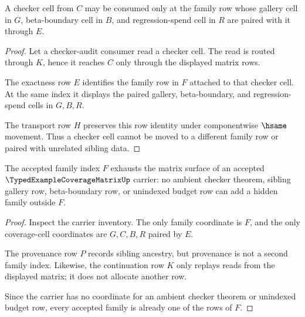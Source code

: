 \begin{theorem}
\label{thm:typed-example-coverage-matrix-checker-cell-locality}
A checker cell from $C$ may be consumed only at the family row whose gallery cell in $G$, beta-boundary cell in $B$, and regression-spend cell in $R$ are paired with it through $E$.
\end{theorem}
\begin{proof}
Let a checker-audit consumer read a checker cell. The read is routed through $K$, hence it reaches $C$ only through the displayed matrix rows.

The exactness row $E$ identifies the family row in $F$ attached to that checker cell. At the same index it displays the paired gallery, beta-boundary, and regression-spend cells in $G,B,R$.

The transport row $H$ preserves this row identity under componentwise $\hsame$ movement. Thus a checker cell cannot be moved to a different family row or paired with unrelated sibling data.
\end{proof}

\begin{theorem}
\label{thm:typed-example-coverage-matrix-family-exhaustion}
The accepted family index $F$ exhausts the matrix surface of an accepted $\TypedExampleCoverageMatrixUp$ carrier: no ambient checker theorem, sibling gallery row, beta-boundary row, or unindexed budget row can add a hidden family outside $F$.
\end{theorem}
\begin{proof}
Inspect the carrier inventory. The only family coordinate is $F$, and the only coverage-cell coordinates are $G,C,B,R$ paired by $E$.

The provenance row $P$ records sibling ancestry, but provenance is not a second family index. Likewise, the continuation row $K$ only replays reads from the displayed matrix; it does not allocate another row.

Since the carrier has no coordinate for an ambient checker theorem or unindexed budget row, every accepted family is already one of the rows of $F$.
\end{proof}

